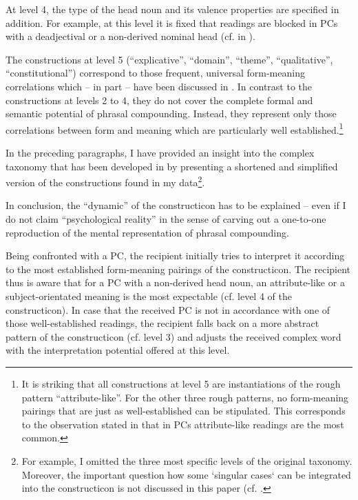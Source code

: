 \documentclass[output=paper]{LSP/langsci}
\begin{document}
At level 4, the  type of the head noun and its valence  properties are specified in addition. For example, at this level it is fixed that  readings are blocked in PCs with a deadjectival or a non-derived nominal head (cf.  in ).


The constructions at level 5 (``explicative'', ``domain'', ``theme'', ``qualitative'', ``constitutional'') correspond to those frequent, universal form-meaning correlations which -- in part -- have been discussed in .  In contrast to the constructions at levels 2 to 4, they do not cover the complete formal and semantic potential of phrasal compounding.  Instead, they represent only those correlations between form and meaning which are particularly well established.\footnote{It is striking that all constructions at level 5 are instantiations of the rough pattern ``attribute-like''. For the other  three rough patterns, no form-meaning pairings that are just as well-established can be stipulated.  This corresponds to the observation stated in  that in PCs attribute-like readings are the most common.} 



In the preceding paragraphs, I have provided an insight into the complex taxonomy that has been developed in \citet{Hein2015} by presenting a shortened and simplified version of the constructions found in my data\footnote{For example, I omitted the three most specific levels of the original taxonomy. Moreover, the important question how some ‘singular cases‘ can be integrated into the constructicon is not discussed in this paper (cf. \citealt[Chapter III.3.1.4.2]{Hein2015}.}. 



In conclusion, the ``dynamic'' of the constructicon has to be explained -- even if I do not claim ``psychological reality'' in the sense of carving out a one-to-one reproduction of the mental representation of phrasal compounding. 

Being confronted with a PC, the recipient initially tries to interpret it according to the most established form-meaning pairings of the constructicon. The recipient thus is aware that for a PC with a non-derived head noun, an attribute-like or a subject-orientated meaning is the most expectable (cf. level 4 of the constructicon).  In case that the received PC is not in accordance with one of those well-established readings,  the recipient falls back on a more abstract pattern of the constructicon (cf. level 3) and adjusts the received complex word with the interpretation potential offered at this level. 
\end{document}
